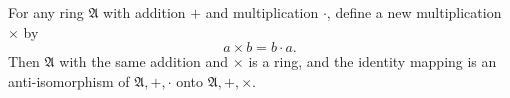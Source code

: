 For any ring $\mathfrak{A}$ with addition $+$ and multiplication $\cdot$, define a new multiplication $\times$ by
$$a \times b = b \cdot a.$$
Then $\mathfrak{A}$ with the same addition and $\times$ is a ring, and the identity mapping is an anti-isomorphism of $\mathfrak{A}, +, \cdot$ onto $\mathfrak{A}, +, \times$.

